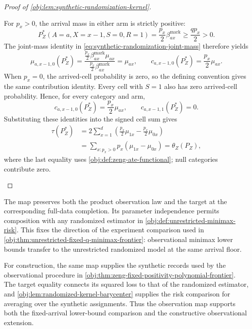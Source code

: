 \documentclass[11pt]{article}
\begin{document}
\begin{proof}[Proof of \cref{obj:lem:synthetic-randomization-kernel}]
\begin{enumerate}
For \(p_x>0\), the arrival mass in either arm is strictly positive:
\[
P_Z^*(A=a,X=x-1,S=0,R=1)
=
\frac{p_x}{2}\beta^{\mathrm{mark}}_{ax}
\ge\frac{qp_x}{2}>0.
\]
The joint-mass identity in \cref{eq:synthetic-randomization-joint-mass} therefore yields
\[
\mu_{a,x-1,0}(P_Z^*)
=
\frac{\frac{p_x}{2}\beta^{\mathrm{mark}}_{ax}\mu_{ax}}
     {\frac{p_x}{2}\beta^{\mathrm{mark}}_{ax}}
=\mu_{ax},
\qquad
c_{a,x-1,0}(P_Z^*)=\frac{p_x}{2}\mu_{ax}.
\]
When \(p_x=0\), the arrived-cell probability is zero, so the defining convention gives the same contribution identity. Every cell with \(S=1\) also has zero arrived-cell probability. Hence, for every category and arm,
\[
c_{a,x-1,0}(P_Z^*)=\frac{p_x}{2}\mu_{ax},
\qquad
c_{a,x-1,1}(P_Z^*)=0.
\]
Substituting these identities into the signed cell sum gives
\[
\begin{aligned}
\tau(P_Z^*)
&=2\sum_{x=1}^d
\left(\frac{p_x}{2}\mu_{1x}
-\frac{p_x}{2}\mu_{0x}\right)\\
&=\sum_{x:p_x>0}p_x(\mu_{1x}-\mu_{0x})
=\theta_Z(P_Z),
\end{aligned}
\]
where the last equality uses \cref{obj:def:zeng-ate-functional}; null categories contribute zero.
\end{enumerate}
\end{proof}

The map preserves both the product observation law and the target at the corresponding full-data completion. Its parameter independence permits composition with any randomized estimator in \cref{obj:def:unrestricted-minimax-risk}. This fixes the direction of the experiment comparison used in \cref{obj:thm:unrestricted-fixed-q-minimax-frontier}: observational minimax lower bounds transfer to the unrestricted randomized model at the same arrival floor.

For construction, the same map supplies the synthetic records used by the observational procedure in \cref{obj:thm:zeng-fixed-positivity-polynomial-frontier}. The target equality connects its squared loss to that of the randomized estimator, and \cref{obj:lem:randomized-kernel-barycenter} supplies the risk comparison for averaging over the synthetic assignments. Thus the observation map supports both the fixed-arrival lower-bound comparison and the constructive observational extension.
\end{document}
